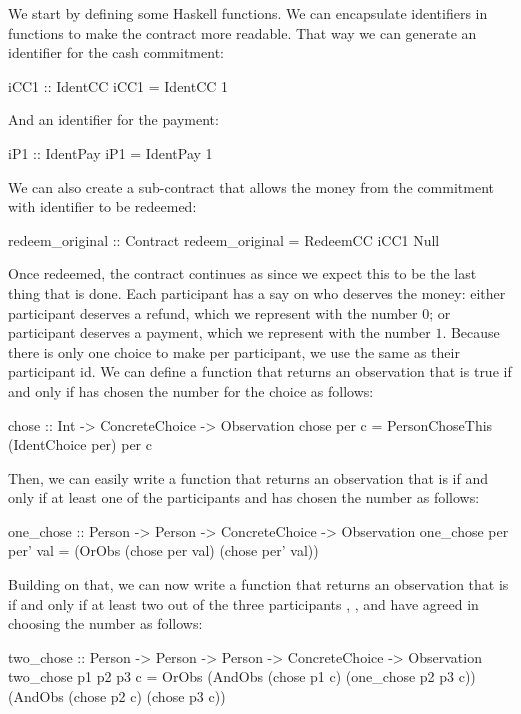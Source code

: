 \documentclass[runningheads]{llncs}
\begin{document}
We start by defining some Haskell functions. We can encapsulate identifiers in functions to make the contract more 
readable. That way we can generate an identifier for the cash commitment:

\begin{haskellcode}
iCC1 :: IdentCC
iCC1 = IdentCC 1
\end{haskellcode}
And an identifier for the payment:
\begin{haskellcode}
iP1 :: IdentPay
iP1 = IdentPay 1
\end{haskellcode}
We can also create a sub-contract that allows the money from the commitment with identifier  to 
be redeemed:
\begin{haskellcode}
redeem_original :: Contract
redeem_original = RedeemCC iCC1 Null
\end{haskellcode}
Once redeemed, the contract continues as  since we expect this to be the last thing that is done.
Each participant has a say on who deserves the money: either participant  deserves a refund, which we 
represent with the number $0$; or participant  deserves a payment, which we represent with the number 
$1$. Because there is only one choice to make per participant, we use the same  as their 
participant id. We can define a function that returns an observation that is true if and only if
 has chosen the number  for the choice  as follows:
\begin{haskellcode}
chose :: Int -> ConcreteChoice -> Observation
chose per c = PersonChoseThis (IdentChoice per) per c
\end{haskellcode}
Then, we can easily write a function that returns an observation that is  if and only if at least one of the 
participants  and  has chosen the number  as follows:
\begin{haskellcode}
one_chose :: Person -> Person -> ConcreteChoice -> Observation
one_chose per per' val = (OrObs (chose per val) (chose per' val)) 
\end{haskellcode}
Building on that, we can now write a function that returns an observation that is  if and only if at least 
two out of the three participants , , and  have agreed in 
choosing the number  as follows:
\begin{haskellcode}
two_chose :: Person -> Person -> Person -> ConcreteChoice -> Observation
two_chose p1 p2 p3 c = OrObs (AndObs (chose p1 c) (one_chose p2 p3 c))
                             (AndObs (chose p2 c) (chose p3 c))
\end{haskellcode}
\end{document}

